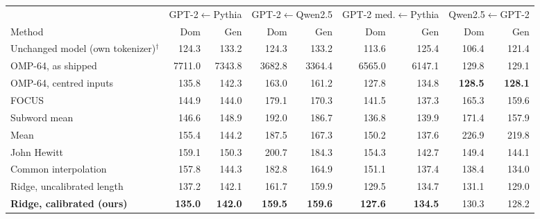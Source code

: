 \begin{tabular}{lrrrrrrrr}
\toprule
 & \multicolumn{2}{c}{GPT-2$\leftarrow$Pythia} & \multicolumn{2}{c}{GPT-2$\leftarrow$Qwen2.5} & \multicolumn{2}{c}{GPT-2 med.$\leftarrow$Pythia} & \multicolumn{2}{c}{Qwen2.5$\leftarrow$GPT-2} \\
\cmidrule(lr){2-3}\cmidrule(lr){4-5}\cmidrule(lr){6-7}\cmidrule(lr){8-9}
Method & Dom & Gen & Dom & Gen & Dom & Gen & Dom & Gen \\
\midrule
Unchanged model (own tokenizer)$^{\dagger}$ & 124.3 & 133.2 & 124.3 & 133.2 & 113.6 & 125.4 & 106.4 & 121.4 \\
\midrule
OMP-64, as shipped & 7711.0 & 7343.8 & 3682.8 & 3364.4 & 6565.0 & 6147.1 & 129.8 & 129.1 \\
OMP-64, centred inputs & 135.8 & 142.3 & 163.0 & 161.2 & 127.8 & 134.8 & \textbf{128.5} & \textbf{128.1} \\
FOCUS & 144.9 & 144.0 & 179.1 & 170.3 & 141.5 & 137.3 & 165.3 & 159.6 \\
Subword mean & 146.6 & 148.9 & 192.0 & 186.7 & 136.8 & 139.9 & 171.4 & 157.9 \\
Mean & 155.4 & 144.2 & 187.5 & 167.3 & 150.2 & 137.6 & 226.9 & 219.8 \\
John Hewitt & 159.1 & 150.3 & 200.7 & 184.3 & 154.3 & 142.7 & 149.4 & 144.1 \\
Common interpolation & 157.8 & 144.3 & 182.8 & 164.9 & 151.1 & 137.4 & 138.4 & 134.0 \\
Ridge, uncalibrated length & 137.2 & 142.1 & 161.7 & 159.9 & 129.5 & 134.7 & 131.1 & 129.0 \\
\textbf{Ridge, calibrated (ours)} & \textbf{135.0} & \textbf{142.0} & \textbf{159.5} & \textbf{159.6} & \textbf{127.6} & \textbf{134.5} & 130.3 & 128.2 \\
\bottomrule
\end{tabular}
